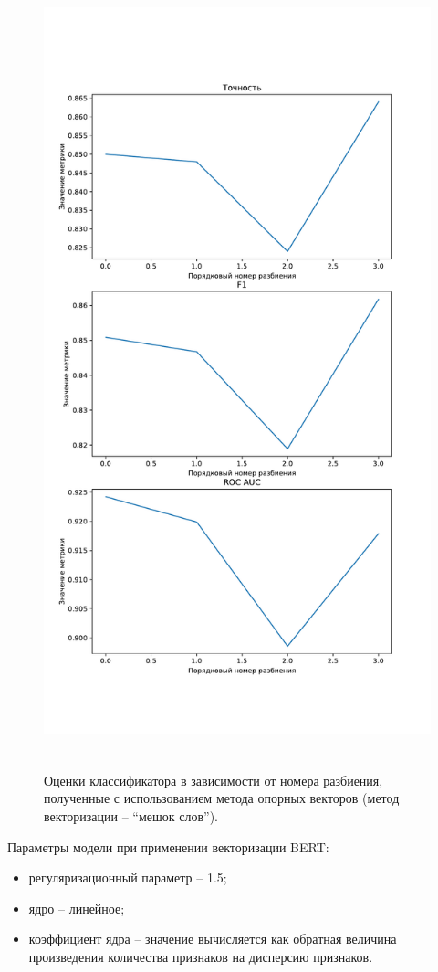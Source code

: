\begin{figure}[H]
	\centering
	\includegraphics[height=23cm]{inc/plots/svcMetricsBag.pdf}
	\caption{ Оценки классификатора в зависимости от номера разбиения, полученные с использованием метода опорных векторов (метод векторизации --  ``мешок слов''). }
	\label{img:svcMetricsBag}
\end{figure}


Параметры модели при применении векторизации BERT:
\begin{itemize}
	\item регуляризационный параметр -- 1.5;
	\item ядро -- линейное;
	\item коэффициент ядра -- значение вычисляется как обратная величина произведения количества признаков на дисперсию признаков.
\end{itemize}

